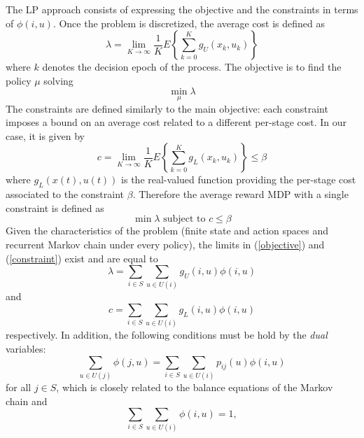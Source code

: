 The LP approach consists of expressing the objective and the constraints in terms of $\phi\left(i,u\right)$. Once the problem is discretized, the average cost is defined as
\begin{equation}\label{objective}
\lambda = \lim_{K\rightarrow\infty}\frac{1}{K}
E\left\{\sum^{K}_{k=0}g_{U}\left(x_{k},u_{k}\right)\right\}
\end{equation}
where $k$ denotes the decision epoch of the process. The objective is to find the policy $\mu$ solving
\begin{equation}
\min_{\mu} \lambda
\end{equation}
The constraints are defined similarly to the main objective: each constraint imposes a bound on an average cost related to a different per-stage cost. In our case, it is given by
\begin{equation}\label{constraint}
c = \lim_{K\rightarrow\infty}\frac{1}{K}
E\left\{\sum^{K}_{k=0}g_{L}\left(x_{k},u_{k}\right)\right\} \leq \beta
\end{equation}
where $g_{L}\left(x(t),u(t)\right)$ is the real-valued function providing the per-stage cost associated to the constraint $\beta$. Therefore the average reward MDP with a single constraint is defined as
\begin{equation}
\min \lambda \text{ subject to } c \leq \beta
\end{equation}
Given the characteristics of the problem (finite state and action spaces and recurrent Markov chain under every policy), the limits in (\ref{objective}) and (\ref{constraint}) exist and are equal to
\begin{equation}
\lambda = \displaystyle\sum_{i\in S}\displaystyle\sum_{u\in U(i)}g_{U}\left(i,u\right)\phi\left(i,u\right)
\end{equation}
and
\begin{equation}
c = \displaystyle\sum_{i\in S}\displaystyle\sum_{u\in U(i)}g_{L}\left(i,u\right)\phi\left(i,u\right)
\end{equation}
respectively. In addition, the following conditions must be hold by the \textit{dual} variables:
\begin{equation}
\displaystyle\sum_{u\in U(j)}\phi\left(j,u\right) = \displaystyle\sum_{i\in S}\displaystyle\sum_{u\in U(i)}p_{ij}\left(u\right)\phi\left(i,u\right)
\end{equation}
for all $j \in S$, which is closely related to the balance equations of the Markov chain and
\begin{equation}
\displaystyle\sum_{i\in S}\displaystyle\sum_{u\in U(i)}\phi\left(i,u\right) = 1,
\end{equation}
